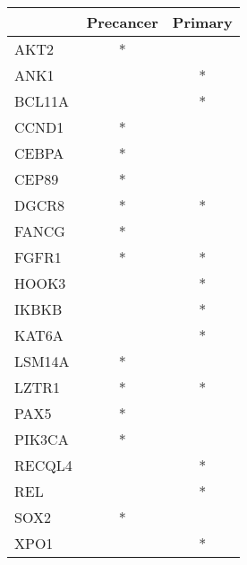 \begin{tabular}{lcc}
\toprule
{} & Precancer & Primary \\
\midrule
AKT2   &         * &         \\
ANK1   &           &       * \\
BCL11A &           &       * \\
CCND1  &         * &         \\
CEBPA  &         * &         \\
CEP89  &         * &         \\
DGCR8  &         * &       * \\
FANCG  &         * &         \\
FGFR1  &         * &       * \\
HOOK3  &           &       * \\
IKBKB  &           &       * \\
KAT6A  &           &       * \\
LSM14A &         * &         \\
LZTR1  &         * &       * \\
PAX5   &         * &         \\
PIK3CA &         * &         \\
RECQL4 &           &       * \\
REL    &           &       * \\
SOX2   &         * &         \\
XPO1   &           &       * \\
\bottomrule
\end{tabular}
